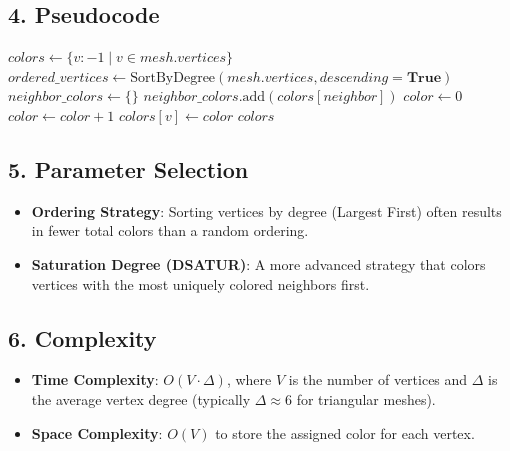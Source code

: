\subsection{4. Pseudocode}

\begin{algorithm}
\caption{Color Mesh}
\label{alg:color_mesh}
\begin{algorithmic}[1]
    \State $\mathit{colors} \gets \{v : -1 \mid v \in mesh.\mathit{vertices}\}$
    \State $\mathit{ordered\_vertices} \gets \text{SortByDegree}(mesh.\mathit{vertices}, \textit{descending} = \textbf{True})$
        \State $\mathit{neighbor\_colors} \gets \{\}$
                \State $\mathit{neighbor\_colors}.\text{add}(\mathit{colors}[\mathit{neighbor}])$
            \EndIf
        \EndFor
        \State $\mathit{color} \gets 0$
            \State $\mathit{color} \gets \mathit{color} + 1$
        \EndWhile
        \State $\mathit{colors}[v] \gets \mathit{color}$
    \EndFor
    \State \Return $\mathit{colors}$
\EndFunction
\end{algorithmic}
\end{algorithm}

\subsection{5. Parameter Selection}

\begin{itemize}
    \item \textbf{Ordering Strategy}: Sorting vertices by degree (Largest First) often results in fewer total colors than a random ordering.
    \item \textbf{Saturation Degree (DSATUR)}: A more advanced strategy that colors vertices with the most uniquely colored neighbors first.
\end{itemize}

\subsection{6. Complexity}

\begin{itemize}
    \item \textbf{Time Complexity}: $O(V \cdot \Delta)$, where $V$ is the number of vertices and $\Delta$ is the average vertex degree (typically $\Delta \approx 6$ for triangular meshes).
    \item \textbf{Space Complexity}: $O(V)$ to store the assigned color for each vertex.
\end{itemize}

